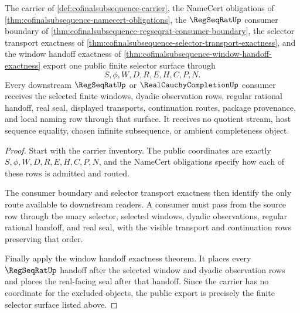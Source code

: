 \begin{theorem}
\label{thm:cofinalsubsequence-public-export-package}
The carrier of \autoref{def:cofinalsubsequence-carrier}, the NameCert obligations of \autoref{thm:cofinalsubsequence-namecert-obligations}, the $\RegSeqRatUp$ consumer boundary of \autoref{thm:cofinalsubsequence-regseqrat-consumer-boundary}, the selector transport exactness of \autoref{thm:cofinalsubsequence-selector-transport-exactness}, and the window handoff exactness of \autoref{thm:cofinalsubsequence-window-handoff-exactness} export one public finite selector surface through
$$
S,\phi,W,D,R,E,H,C,P,N.
$$
Every downstream $\RegSeqRatUp$ or $\RealCauchyCompletionUp$ consumer receives the selected finite windows, dyadic observation rows, regular rational handoff, real seal, displayed transports, continuation routes, package provenance, and local naming row through that surface. It receives no quotient stream, host sequence equality, chosen infinite subsequence, or ambient completeness object.
\end{theorem}
\begin{proof}
Start with the carrier inventory. The public coordinates are exactly $S,\phi,W,D,R,E,H,C,P,N$, and the NameCert obligations specify how each of these rows is admitted and routed.

The consumer boundary and selector transport exactness then identify the only route available to downstream readers. A consumer must pass from the source row through the unary selector, selected windows, dyadic observations, regular rational handoff, and real seal, with the visible transport and continuation rows preserving that order.

Finally apply the window handoff exactness theorem. It places every $\RegSeqRatUp$ handoff after the selected window and dyadic observation rows and places the real-facing seal after that handoff. Since the carrier has no coordinate for the excluded objects, the public export is precisely the finite selector surface listed above.
\end{proof}

